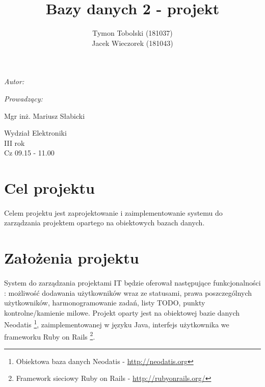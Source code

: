 \documentclass[wide,a4paper,titlepage,12pt] {article}
\title{Bazy danych 2 - projekt}
\author{Tymon Tobolski (181037)\\ Jacek Wieczorek (181043)}
\makeatletter
\renewcommand{\maketitle}{
\begin{titlepage}
  \begin{center}
    \vspace*{3cm}
    \LARGE \@title \par
    \vspace{2cm}
    \textit{\small Autor:}\par
    \normalsize \@author\par \normalsize
    \vspace{3cm}
    \textit{\small Prowadzący:}\par
    Mgr inż. Mariusz Słabicki \par
    \vspace{2cm}
    Wydział Elektroniki\\ III rok\\ Cz 09.15 - 11.00\par
    \vspace{4cm}
    \small \@date
  \end{center}
\end{titlepage}
}
\makeatother
\begin{document}
\maketitle

\section{Cel projektu}
\paragraph{}
Celem projektu jest zaprojektowanie i zaimplementowanie systemu do zarządzania projektem opartego na obiektowych bazach danych.

\section{Założenia projektu}
\paragraph{}
System do zarządzania projektami IT będzie oferował następujące funkcjonalności : możliwość dodawania użytkowników wraz ze statusami, prawa poszczególnych użytkowników, harmonogramowanie zadań, listy TODO, punkty kontrolne/kamienie milowe. Projekt oparty jest na obiektowej bazie danych Neodatis \footnote{Obiektowa baza danych Neodatis - \url{http://neodatis.org}}, zaimplementowanej w języku Java, interfejs użytkownika we frameworku Ruby on Rails \footnote{Framework sieciowy Ruby on Rails - \url{http://rubyonrails.org/}}.
\end{document}
